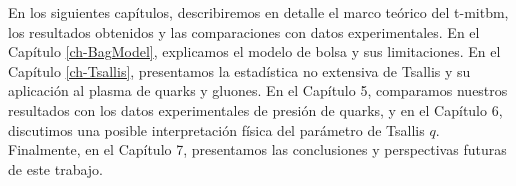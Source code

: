 En los siguientes capítulos, describiremos en detalle el marco teórico del \acrshort{t-mitbm}, los resultados obtenidos y las comparaciones con datos experimentales. En el Capítulo \ref{ch-BagModel}, explicamos el modelo de bolsa y sus limitaciones. En el Capítulo \ref{ch-Tsallis}, presentamos la estadística no extensiva de Tsallis y su aplicación al plasma de quarks y gluones. En el Capítulo 5, comparamos nuestros resultados con los datos experimentales de presión de quarks, y en el Capítulo 6, discutimos una posible interpretación física del parámetro de Tsallis $q$. Finalmente, en el Capítulo 7, presentamos las conclusiones y perspectivas futuras de este trabajo.

\newpage

\thispagestyle{empty}